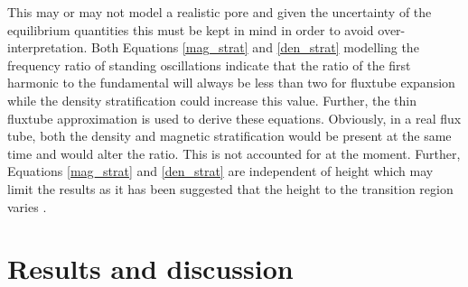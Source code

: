     This may or may not model a realistic pore and given the uncertainty of the equilibrium quantities this must be kept in mind in order to avoid over-interpretation.
    Both Equations \ref{mag_strat} and \ref{den_strat} modelling the frequency ratio of standing oscillations indicate that the ratio of the first harmonic to the fundamental will always be less than two for fluxtube expansion while the density stratification could increase this value.
    Further, the thin fluxtube approximation is used to derive these equations.
    Obviously, in a real flux tube, both the density and magnetic stratification would be present at the same time and would alter the ratio.
    This is not accounted for at the moment.
    Further, Equations \ref{mag_strat} and \ref{den_strat} are independent of height which may limit the results as it has been suggested that the height to the transition region varies \citep{tian2009solar}.	
    
\section{Results and discussion}
\label{res}

